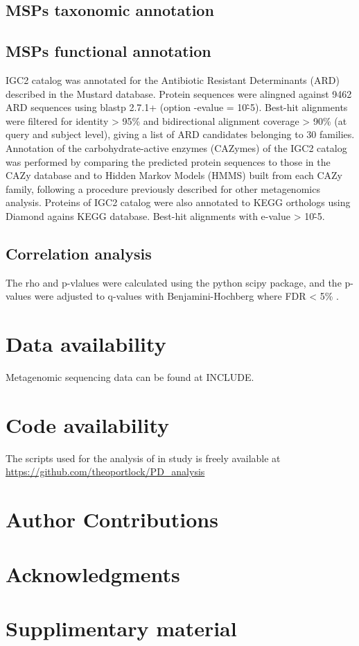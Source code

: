 \documentclass{article}
\begin{document}
\subsection{MSPs taxonomic annotation}
\subsection{MSPs functional annotation}
\gls{IGC2} catalog was annotated for the Antibiotic Resistant Determinants (ARD) described in the Mustard database.
Protein sequences were alingned against 9462 ARD sequences using blastp 2.7.1+ (option -evalue = 10\^-5).
Best-hit alignments were filtered for identity \textgreater{} 95\% and bidirectional alignment coverage \textgreater{} 90\% (at query and subject level), giving a list of ARD candidates belonging to 30 families.
Annotation of the carbohydrate-active enzymes (CAZymes) of the IGC2 catalog was performed by comparing the predicted protein sequences to those in the CAZy database and to Hidden Markov Models (HMMS) built from each CAZy family, following a procedure previously described for other metagenomics analysis.
Proteins of IGC2 catalog were also annotated to KEGG orthologs using Diamond agains KEGG database.
Best-hit alignments with e-value \textgreater{} 10\^-5.

\subsection{Correlation analysis}
The rho and p-vlalues were calculated using the python scipy package, and the p-values were adjusted to q-values with Benjamini-Hochberg where \gls{FDR} \textless{} 5\% .

\section{Data availability}
Metagenomic sequencing data can be found at INCLUDE.

\section{Code availability}
The scripts used for the analysis of in study is freely available at \url{https://github.com/theoportlock/PD_analysis}

\section{Author Contributions}
\section{Acknowledgments}



\section{Supplimentary material}
\end{document}
